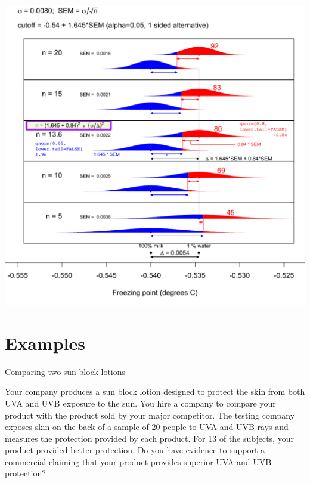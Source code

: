 \documentclass{beamer}\usepackage[]{graphicx}\usepackage[]{color}
\begin{document}
\begin{frame}
\begin{center}
	\includegraphics[scale=0.5]{../sample_size/SampleSize1pctWaterAdded.pdf} 
\end{center}
\end{frame}



\section{Examples}



\begin{frame}{Comparing two sun block lotions}

\begin{example}
	Your company produces a sun block lotion designed to protect the skin from both UVA and UVB exposure to the sun. You hire a company to compare your product with the product sold by your major competitor. The testing company exposes skin on the back of a sample of 20 people to UVA and UVB rays and measures the protection provided by each product. For 13 of the subjects, your product provided better protection. Do you have evidence to support a commercial claiming that your product provides superior UVA and UVB protection?
\end{example}


\end{frame}
\end{document}
